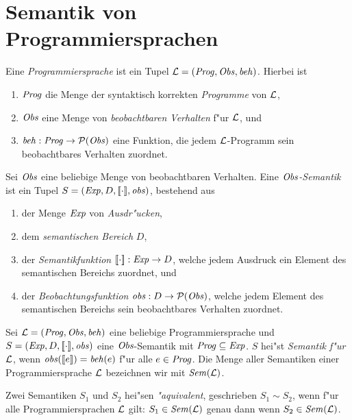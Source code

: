\documentclass[12pt,a4paper]{article}
\begin{document}
\section{Semantik von Programmiersprachen}

\begin{definition}[Programmiersprache]
  Eine \emph{Programmiersprache} ist ein Tupel $\mathcal L = (\mathit{Prog},\mathit{Obs},\mathit{beh})$. Hierbei ist
  \begin{enumerate}
  \item $\mathit{Prog}$ die Menge der syntaktisch korrekten \emph{Programme} von $\mathcal L$,
  \item $\mathit{Obs}$ eine Menge von \emph{beobachtbaren Verhalten} f"ur $\mathcal L$, und
  \item $\mathit{beh}: \mathit{Prog} \to \mathcal{P}(\mathit{Obs})$ eine Funktion, die jedem $\mathcal L$-Programm sein
    beobachtbares Verhalten zuordnet.
  \end{enumerate}
\end{definition}

\begin{definition}[Semantik]
  Sei $\mathit{Obs}$ eine beliebige Menge von beobachtbaren Verhalten. Eine \emph{$\mathit{Obs}$-Semantik} ist
  ein Tupel $S = (\mathit{Exp},D,[\![\cdot]\!],\mathit{obs})$, bestehend aus
  \begin{enumerate}
  \item der Menge $\mathit{Exp}$ von \emph{Ausdr"ucken},
  \item dem \emph{semantischen Bereich} $D$,
  \item der \emph{Semantikfunktion} $[\![\cdot]\!]:\mathit{Exp} \to D$, welche jedem Ausdruck
    ein Element des semantischen Bereichs zuordnet, und
  \item der \emph{Beobachtungsfunktion} $\mathit{obs}:D \to \mathcal{P}(\mathit{Obs})$, welche jedem Element
    des semantischen Bereichs sein beobachtbares Verhalten zuordnet.
  \end{enumerate}
\end{definition}

\begin{definition}
  Sei $\mathcal L=(\mathit{Prog},\mathit{Obs},\mathit{beh})$ eine beliebige Programmiersprache und $S=(\mathit{Exp},D,[\![\cdot]\!],\mathit{obs})$
  eine $\mathit{Obs}$-Semantik mit $\mathit{Prog} \subseteq \mathit{Exp}$. $S$ hei"st \emph{Semantik f"ur $\mathcal L$}, wenn 
  $\mathit{obs}([\![e]\!]) = \mathit{beh}(e)$ f"ur alle $e \in \mathit{Prog}$.
  Die Menge aller Semantiken einer Programmiersprache $\mathcal L$ bezeichnen wir mit $\mathit{Sem}(\mathcal L)$.
\end{definition}

\begin{definition}
  Zwei Semantiken $S_1$ und $S_2$ hei"sen \emph{"aquivalent}, geschrieben $S_1 \sim S_2$, wenn
  f"ur alle Programmiersprachen $\mathcal L$ gilt: $S_1 \in \mathit{Sem}(\mathcal L)$ genau dann wenn $S_2 \in \mathit{Sem}(\mathcal L)$.
\end{definition}
\end{document}

